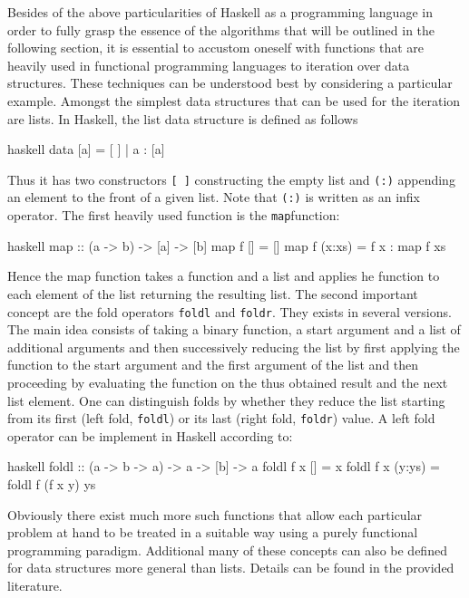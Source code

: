 \documentclass[a4paper,12pt, DIV=14, BCOR=5mm, twoside, headsepline, numbers=noenddot]{scrbook}
\begin{document}
Besides of the above particularities of Haskell as a programming language in order to fully grasp the essence of the algorithms that will be outlined in the following section, it is essential to accustom oneself with functions that are heavily used in functional programming languages to iteration over data structures. These techniques can be understood best by considering a particular example. Amongst the simplest data structures that can be used for the iteration are lists. In Haskell, the list data structure is defined as follows 
\begin{center}
\begin{cminted}{haskell}
data [a] = [ ] | a : [a] 
\end{cminted}
\end{center}
Thus it has two constructors \texttt{[ ]} constructing the empty list and \texttt{(:)} appending an element to the front of a given list. Note that \texttt{(:)} is written as an infix operator.
The first heavily used function is the \texttt{map}function:
\begin{center}
\begin{cminted}{haskell}
map :: (a -> b) -> [a] -> [b]
map f [] = [] 
map f (x:xs) =  f x : map f xs 
\end{cminted}
\end{center}
Hence the map function takes a function and a list and applies he function to each element of the list returning the resulting list. The second important concept are the fold operators \texttt{foldl} and \texttt{foldr}. They exists in several versions. The main idea consists of taking a binary function, a start argument and a list of additional arguments and then successively reducing the list by first applying the function to the start argument and the first argument of the list and then proceeding by evaluating the function on the thus obtained result and the next list element. One can distinguish folds by whether they reduce the list starting from its first (left fold, \texttt{foldl}) or its last (right fold, \texttt{foldr}) value. A left fold operator can be implement in Haskell according to:
\begin{center}
\begin{cminted}{haskell}
foldl :: (a -> b -> a) -> a -> [b] -> a 
foldl f x [] = x 
foldl f x (y:ys) = foldl f (f x y) ys
\end{cminted}
\end{center}
Obviously there exist much more such functions that allow each particular problem at hand to be treated in a suitable way using a purely functional programming paradigm. Additional many of these concepts can also be defined for data structures more general than lists. Details can be found in the provided literature.
\end{document}
